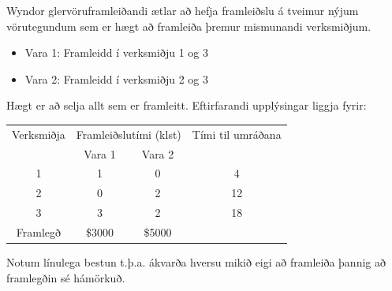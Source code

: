 \begin{daemi}\label{wyndor:org}
Wyndor glervöru\-framleiðandi ætlar að hefja framleiðslu á tveimur nýjum vörutegundum sem er hægt að framleiða þremur mismunandi verksmiðjum. 
\begin{itemize}
 \item Vara 1: Framleidd í verksmiðju 1 og 3
 \item Vara 2: Framleidd í verksmiðju 2 og 3
\end{itemize}
Hægt er að selja allt sem er framleitt. 
Eftirfarandi upplýsingar liggja fyrir:
\begin{center}{\renewcommand{\arraystretch}{1.5} \renewcommand{\tabcolsep}{0.2cm}
\begin{tabular}{|cccc|} \hline 
Verksmiðja & \multicolumn{2}{c}{Framleiðslutími (klst)} & Tími til umráðana \\
& Vara 1 & Vara 2 &  \\ \hline
1 & 1 & 0 & 4 \\
2 & 0 & 2 & 12 \\
3 & 3 & 2 & 18 \\ \hline 
Framlegð & \$3000 & \$5000 & \\ \hline
\end{tabular}

}\end{center}

Notum línulega bestun t.þ.a. ákvarða hversu mikið eigi að framleiða þannig að framlegðin sé hámörkuð.
\end{daemi}
